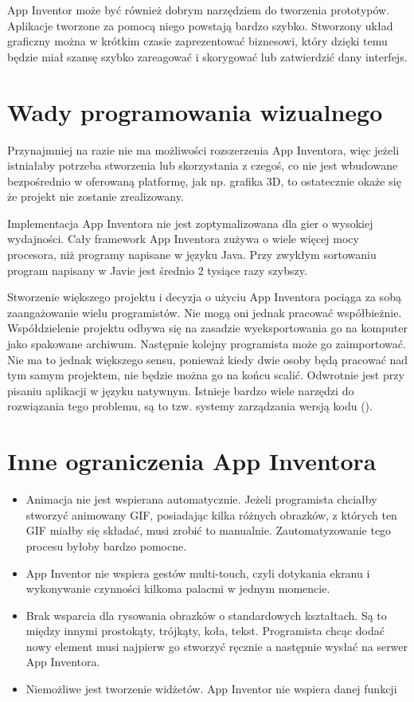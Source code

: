 App Inventor może być również dobrym narzędziem do tworzenia prototypów. Aplikacje tworzone za pomocą niego powstają bardzo szybko. Stworzony układ graficzny można w krótkim czasie zaprezentować biznesowi, który dzięki temu będzie miał szansę szybko zareagować i skorygować lub zatwierdzić dany interfejs.

\section{Wady programowania wizualnego}

Przynajmniej na razie nie ma możliwości rozszerzenia App Inventora, więc jeżeli istniałaby potrzeba stworzenia lub skorzystania z czegoś, co nie jest wbudowane bezpośrednio w oferowaną platformę, jak np. grafika 3D, to ostatecznie okaże się że projekt nie zostanie zrealizowany.

Implementacja App Inventora nie jest zoptymalizowana dla gier o wysokiej wydajności. Cały framework App Inventora zużywa o wiele więcej mocy procesora, niż programy napisane w języku Java. Przy zwykłym sortowaniu program napisany w Javie jest średnio 2 tysiące razy szybszy.

Stworzenie większego projektu i decyzja o użyciu App Inventora pociąga za sobą zaangażowanie wielu programistów. Nie mogą oni jednak pracować współbieżnie. Współdzielenie projektu odbywa się na zasadzie wyeksportowania go na komputer jako spakowane archiwum. Następnie kolejny programista może go zaimportować. Nie ma to jednak większego sensu, ponieważ kiedy dwie osoby będą pracować nad tym samym projektem, nie będzie można go na końcu scalić. Odwrotnie jest przy pisaniu aplikacji w języku natywnym. Istnieje bardzo wiele narzędzi do rozwiązania tego problemu, są to tzw. systemy zarządzania wersją kodu ().

\section{Inne ograniczenia App Inventora}

\begin{itemize}
\item Animacja nie jest wspierana automatycznie. Jeżeli programista chciałby stworzyć animowany GIF, posiadając kilka różnych obrazków, z których ten GIF miałby się składać, musi zrobić to manualnie. Zautomatyzowanie tego procesu byłoby bardzo pomocne.\cite{android:57}
\item App Inventor nie wspiera gestów multi-touch, czyli dotykania ekranu i wykonywanie czynności kilkoma palacmi w jednym momencie.\cite{android:57}
\item Brak wsparcia dla rysowania obrazków o standardowych kształtach. Są to między innymi prostokąty, trójkąty, koła, tekst. Programista chcąc dodać nowy element musi najpierw go stworzyć ręcznie a następnie wysłać na serwer App Inventora.\cite{android:57}
\item Niemożliwe jest tworzenie widżetów. App Inventor nie wspiera danej funkcji
\end{itemize}

